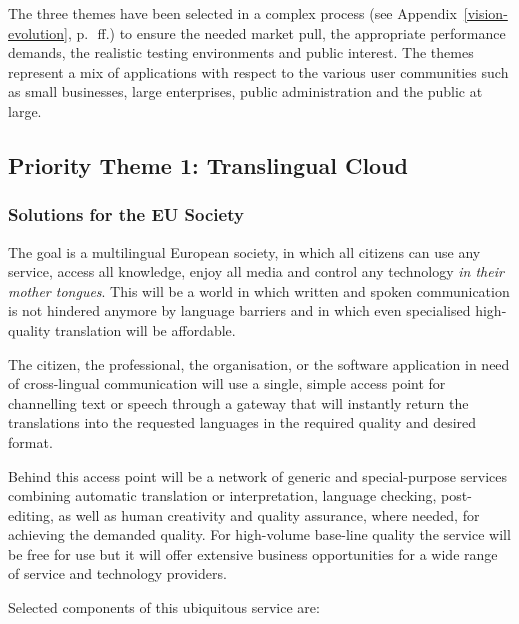 \documentclass[10pt, plain]{../../metanetpaper}
\begin{document}
\begin{multicols}{2}
The three themes have been selected in a complex process (see Appendix~\ref{vision-evolution}, p.~\pageref{vision-evolution}\,ff.) to ensure the needed market pull, the appropriate performance demands, the realistic testing environments and public interest. The themes represent a mix of applications with respect to the various user communities such as small businesses, large enterprises, public administration and the public at large.

\subsection{Priority Theme 1: Translingual Cloud}
\label{sec:priority-theme-1-translation-cloud}

\subsubsection{Solutions for the EU Society}
\label{sec:solutions-eu-society-pt1}

The goal is a multilingual European society, in which all citizens can use any service, access all knowledge, enjoy all media and control any technology \emph{in their mother tongues}. This will be a world in which written and spoken communication is not hindered anymore by language barriers and in which even specialised high-quality translation will be affordable.

The citizen, the professional, the organisation, or the software application in need of cross-lingual communication will use a single, simple access point for channelling text or speech through a gateway that will instantly return the translations into the requested languages in the required quality and desired format.
 
Behind this access point will be a network of generic and special-purpose services combining automatic translation or interpretation, language checking, post-editing, as well as human creativity and quality assurance, where needed, for achieving the demanded quality. For high-volume base-line quality the service will be free for use but it will offer extensive business opportunities for a wide range of service and technology providers.

Selected components of this ubiquitous service are:


\end{multicols}
\end{document}
